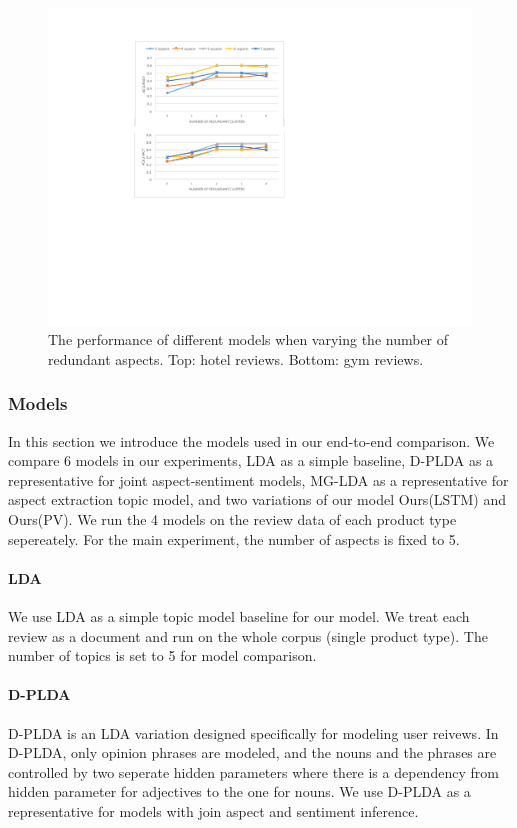 \begin{figure}[th]
\centering
\includegraphics[width=0.9\columnwidth]{figures/differentc}
\caption{The performance of different models when varying the 
number of redundant aspects. Top: hotel reviews. Bottom: gym reviews.}
\label{fig:differentc}
\end{figure}



\subsubsection{Models}

In this section we introduce the models used in our end-to-end comparison.
We compare 6 models in our experiments, 
LDA as a simple baseline, 
D-PLDA \cite{moghaddam2012design} as a representative for joint aspect-sentiment models, 
MG-LDA \cite{titov2008modeling} as a representative for aspect extraction topic model,
and two variations of our model Ours(LSTM) and Ours(PV). 
We run the 4 models on the review data of each product type sepereately. 
For the main experiment, the number of aspects is fixed to 5.

\paragraph{LDA}
We use LDA as a simple topic model baseline for our model. 
We treat each review as a document and run on the whole corpus (single product type). 
The number of topics is set to 5 for model comparison.

\paragraph{D-PLDA}
D-PLDA \cite{moghaddam2012design} is an LDA variation designed specifically for modeling user reivews. 
In D-PLDA, only opinion phrases are modeled, 
and the nouns and the phrases are controlled by two seperate hidden parameters 
where there is a dependency from hidden parameter for adjectives to the one for nouns.
We use D-PLDA as a representative for models with join aspect and sentiment inference.


